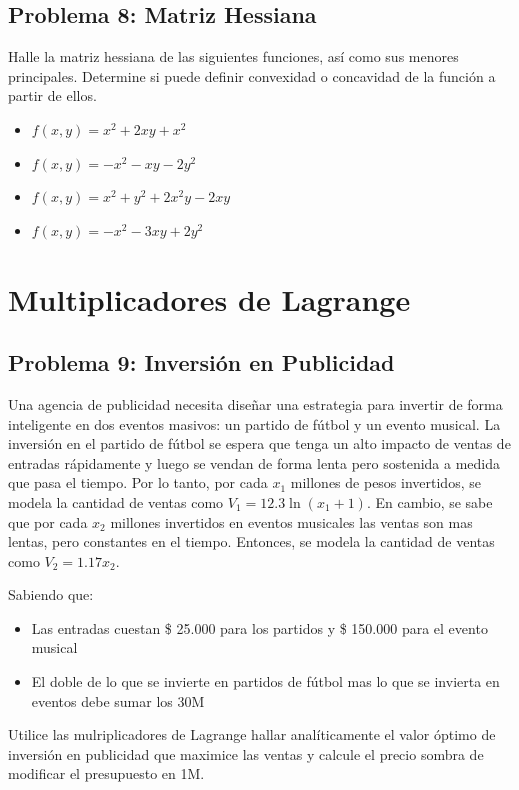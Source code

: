 \documentclass[12pt]{article}
\begin{document}
\subsection*{Problema 8: Matriz Hessiana}

Halle la matriz hessiana de las siguientes funciones, así como sus menores principales. Determine si puede definir convexidad o concavidad de la función a partir de ellos. 

\begin{itemize}
    \item[a)] $f(x,y) = x^2 + 2xy + x^2$
    \item[b)] $f(x,y) = -x^2 -xy -2y^2$
    \item[c)] $f(x,y) = x^2 + y^2 +2x^2y - 2xy $
    \item[d)] $f(x,y) = -x^2 -3xy+2y^2$
\end{itemize}

\section{Multiplicadores de Lagrange}

\subsection*{Problema 9: Inversión en Publicidad}

Una agencia de publicidad necesita diseñar una estrategia para invertir de forma inteligente en dos eventos masivos: un partido de fútbol y un evento musical. La inversión en el partido de fútbol se espera que tenga un alto impacto de ventas de entradas rápidamente y luego se vendan de forma lenta pero sostenida a medida que pasa el tiempo. Por lo tanto, por cada $x_1$ millones de pesos invertidos, se modela la cantidad de ventas como $V_1 = 12.3 \ln (x_1+1)$. En cambio, se sabe que por cada $x_2$ millones invertidos en eventos musicales las ventas son mas lentas, pero constantes en el tiempo. Entonces, se modela la cantidad de ventas como $V_2 = 1.17 x_2$.
 
Sabiendo que:
\begin{itemize}
    \item Las entradas cuestan \$ 25.000 para los partidos y \$ 150.000 para el evento musical
    \item El doble de lo que se invierte en partidos de fútbol mas lo que se invierta en eventos debe sumar los 30M
\end{itemize}
Utilice las mulriplicadores de Lagrange hallar analíticamente el valor óptimo de inversión en publicidad que maximice las ventas y calcule el precio sombra de modificar el presupuesto en 1M.
\end{document}
